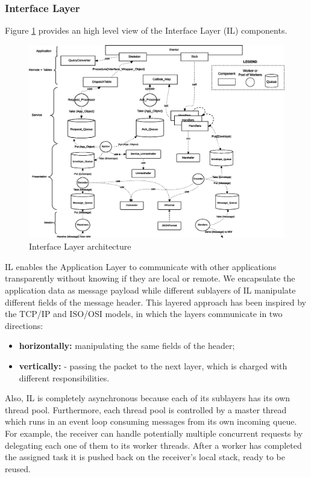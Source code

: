 \subsubsection{Interface Layer}

Figure \ref{fig:impl-il-arch} provides an high level view of
the Interface Layer (IL) components.

\begin{figure}[H]
  \centering
  \includegraphics[width=\columnwidth]{images/solution/il.eps}
  \caption{Interface Layer architecture}
  \label{fig:impl-il-arch}
\end{figure}

IL enables the Application Layer to communicate with other applications
transparently without knowing if they are local or remote. We encapsulate the
application data as message payload while
different sublayers of IL manipulate different fields of the
message header.
This layered approach has been inspired by the TCP/IP and ISO/OSI models, in
which the layers communicate in two directions:
\begin{itemize}
	\item \textbf{horizontally:} manipulating the same fields of the header;
	\item \textbf{vertically:}  - passing the packet to the next
layer, which is charged with different responsibilities.
\end{itemize}
Also, IL is completely asynchronous because each of its sublayers has its own
thread pool. Furthermore, each thread pool is controlled by a master thread which
runs in an event loop consuming messages from its own incoming
queue. For example, the receiver can handle potentially multiple concurrent
requests by delegating each one of them to its worker threads.
After a worker has
completed the assigned task it is pushed back on the receiver's local stack,
ready to be reused.


